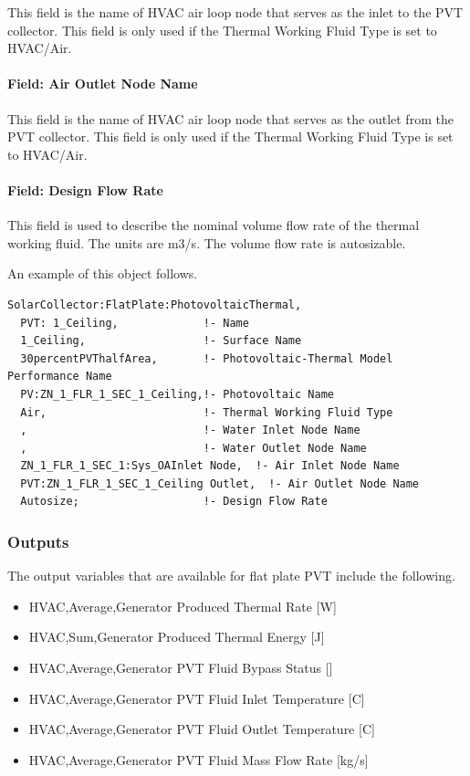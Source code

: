 This field is the name of HVAC air loop node that serves as the inlet to the PVT collector. This field is only used if the Thermal Working Fluid Type is set to HVAC/Air.

\paragraph{Field: Air Outlet Node Name}\label{field-air-outlet-node-name-005}

This field is the name of HVAC air loop node that serves as the outlet from the PVT collector. This field is only used if the Thermal Working Fluid Type is set to HVAC/Air.

\paragraph{Field: Design Flow Rate}\label{field-design-flow-rate-003}

This field is used to describe the nominal volume flow rate of the thermal working fluid. The units are m3/s. The volume flow rate is autosizable.

An example of this object follows.

\begin{lstlisting}
SolarCollector:FlatPlate:PhotovoltaicThermal,
  PVT: 1_Ceiling,             !- Name
  1_Ceiling,                  !- Surface Name
  30percentPVThalfArea,       !- Photovoltaic-Thermal Model Performance Name
  PV:ZN_1_FLR_1_SEC_1_Ceiling,!- Photovoltaic Name
  Air,                        !- Thermal Working Fluid Type
  ,                           !- Water Inlet Node Name
  ,                           !- Water Outlet Node Name
  ZN_1_FLR_1_SEC_1:Sys_OAInlet Node,  !- Air Inlet Node Name
  PVT:ZN_1_FLR_1_SEC_1_Ceiling Outlet,  !- Air Outlet Node Name
  Autosize;                   !- Design Flow Rate
\end{lstlisting}

\subsubsection{Outputs}\label{outputs-3-018}

The output variables that are available for flat plate PVT include the following.

\begin{itemize}
\item
  HVAC,Average,Generator Produced Thermal Rate {[}W{]}
\item
  HVAC,Sum,Generator Produced Thermal Energy {[}J{]}
\item
  HVAC,Average,Generator PVT Fluid Bypass Status {[]}
\item
  HVAC,Average,Generator PVT Fluid Inlet Temperature {[}C{]}
\item
  HVAC,Average,Generator PVT Fluid Outlet Temperature {[}C{]}
\item
  HVAC,Average,Generator PVT Fluid Mass Flow Rate {[}kg/s{]}
\end{itemize}

